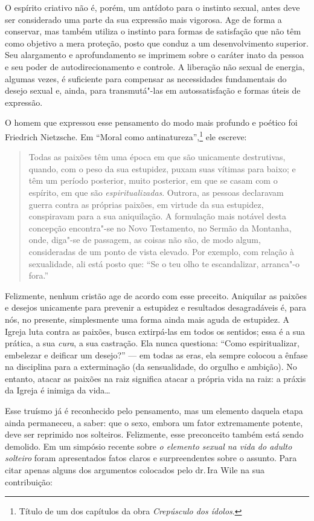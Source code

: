 O espírito criativo não é, porém, um antídoto para o instinto sexual,
antes deve ser considerado uma parte da sua expressão mais vigorosa.
Age de forma a conservar, mas também utiliza o instinto para formas de
satisfação que não têm como objetivo a mera proteção, posto que
conduz a um desenvolvimento superior. Seu alargamento e
aprofundamento se imprimem sobre o caráter inato da pessoa e seu poder
de autodirecionamento e controle. A liberação não sexual de energia,
algumas vezes, é suficiente para compensar as necessidades fundamentais
do desejo sexual e, ainda, para transmutá"-las em autossatisfação e
formas úteis de expressão.

O homem que expressou esse pensamento do modo mais profundo e poético
foi Friedrich Nietzsche. Em ``Moral como antinatureza'',\footnote{Título
  de um dos capítulos da obra \textit{Crepúsculo dos ídolos}.} ele
escreve:

\begin{quote}
Todas as paixões têm uma época em que são unicamente destrutivas,
quando, com o peso da sua estupidez, puxam suas vítimas para baixo; e
têm um período posterior, muito posterior, em que se casam com o
espírito, em que são \textit{espiritualizadas}. Outrora, as pessoas
declaravam guerra contra as próprias paixões, em virtude da sua
estupidez, conspiravam para a sua aniquilação. A formulação mais notável
desta concepção encontra"-se no Novo Testamento, no Sermão da Montanha,
onde, diga"-se de passagem, as coisas não são, de modo algum,
consideradas de um ponto de vista elevado. Por exemplo, com relação à
sexualidade, ali está posto que: ``Se o teu olho te escandalizar,
arranca"-o fora.''
\end{quote}

Felizmente, nenhum cristão age de acordo com esse preceito. Aniquilar as
paixões e desejos unicamente para prevenir a estupidez e resultados
desagradáveis é, para nós, no presente, simplesmente uma forma ainda
mais aguda de estupidez. A Igreja luta contra as paixões,
busca extirpá-las em todos os sentidos; essa é a sua prática, a sua \textit{cura}, a
sua castração. Ela nunca questiona: ``Como espiritualizar, embelezar e
deificar um desejo?'' --- em todas as eras, ela sempre colocou a ênfase
na disciplina para a exterminação (da sensualidade, do orgulho e
ambição). No entanto, atacar as paixões na raiz significa atacar a
própria vida na raiz: a práxis da Igreja é inimiga da vida\ldots{}

Esse truísmo já é reconhecido pelo pensamento, mas um elemento daquela
etapa ainda permaneceu, a saber: que o sexo, embora um fator
extremamente potente, deve ser reprimido nos solteiros.
Felizmente, esse preconceito também está sendo demolido. Em um simpósio
recente sobre \textit{o elemento sexual na vida do adulto solteiro} foram
apresentados fatos claros e surpreendentes sobre o assunto. Para citar
apenas alguns dos argumentos colocados pelo dr.\,Ira Wile na sua contribuição:

